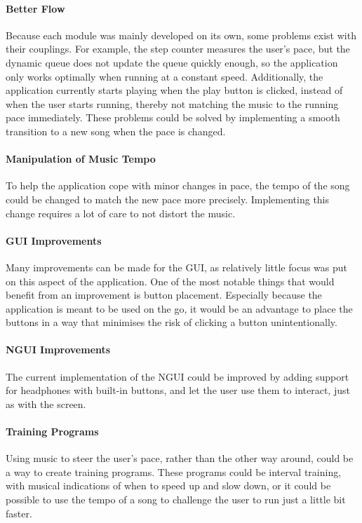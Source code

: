 \paragraph{Better Flow}
Because each module was mainly developed on its own, some problems exist with their couplings.
For example, the step counter measures the user's pace, but the dynamic queue does not update the queue quickly enough, so the application only works optimally when running at a constant speed.
Additionally, the application currently starts playing when the play button is clicked, instead of when the user starts running, thereby not matching the music to the running pace immediately.
These problems could be solved by implementing a smooth transition to a new song when the pace is changed.

\paragraph{Manipulation of Music Tempo}
To help the application cope with minor changes in pace, the tempo of the song could be changed to match the new pace more precisely. Implementing this change requires a lot of care to not distort the music.

\paragraph{GUI Improvements}
Many improvements can be made for the GUI, as relatively little focus was put on this aspect of the application. One of the most notable things that would benefit from an improvement is button placement. Especially because the application is meant to be used on the go, it would be an advantage to place the buttons in a way that minimises the risk of clicking a button unintentionally.

\paragraph{NGUI Improvements}
The current implementation of the NGUI could be improved by adding support for headphones with built-in buttons, and let the user use them to interact, just as with the screen.

\paragraph{Training Programs}
Using music to steer the user's pace, rather than the other way around, could be a way to create training programs.
These programs could be interval training, with musical indications of when to speed up and slow down, or it could be possible to use the tempo of a song to challenge the user to run just a little bit faster.

